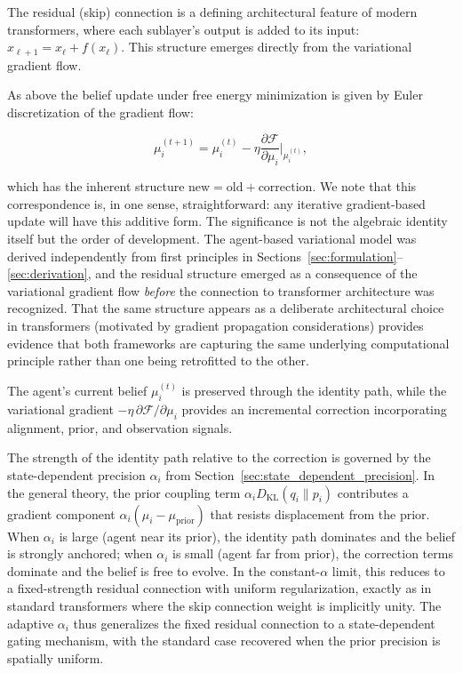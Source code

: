 \documentclass[twoside,11pt]{article}
\begin{document}
The residual (skip) connection is a defining architectural feature of modern transformers, where each sublayer's output is added to its input: $x_{\ell+1} = x_\ell + f(x_\ell)$. This structure emerges directly from the variational gradient flow.

As above the belief update under free energy minimization is given by Euler discretization of the gradient flow:

\begin{equation}
\mu_i^{(t+1)} = \mu_i^{(t)} - \eta \frac{\partial \mathcal{F}}{\partial \mu_i}\bigg|_{\mu_i^{(t)}},
\label{eq:residual_gradient_flow}
\end{equation}

which has the inherent structure $\text{new} = \text{old} + \text{correction}$. We note that this correspondence is, in one sense, straightforward: any iterative gradient-based update will have this additive form. The significance is not the algebraic identity itself but the order of development. The agent-based variational model was derived independently from first principles in Sections~\ref{sec:formulation}--\ref{sec:derivation}, and the residual structure emerged as a consequence of the variational gradient flow \emph{before} the connection to transformer architecture was recognized. That the same structure appears as a deliberate architectural choice in transformers (motivated by gradient propagation considerations) provides evidence that both frameworks are capturing the same underlying computational principle rather than one being retrofitted to the other.

The agent's current belief $\mu_i^{(t)}$ is preserved through the identity path, while the variational gradient $-\eta \,\partial \mathcal{F}/\partial \mu_i$ provides an incremental correction incorporating alignment, prior, and observation signals.

The strength of the identity path relative to the correction is governed by the state-dependent precision $\alpha_i$ from Section~\ref{sec:state_dependent_precision}. In the general theory, the prior coupling term $\alpha_i D_{\mathrm{KL}}(q_i \| p_i)$ contributes a gradient component $\alpha_i(\mu_i - \mu_{\text{prior}})$ that resists displacement from the prior. When $\alpha_i$ is large (agent near its prior), the identity path dominates and the belief is strongly anchored; when $\alpha_i$ is small (agent far from prior), the correction terms dominate and the belief is free to evolve. In the constant-$\alpha$ limit, this reduces to a fixed-strength residual connection with uniform regularization, exactly as in standard transformers where the skip connection weight is implicitly unity. The adaptive $\alpha_i$ thus generalizes the fixed residual connection to a state-dependent gating mechanism, with the standard case recovered when the prior precision is spatially uniform.
\end{document}
